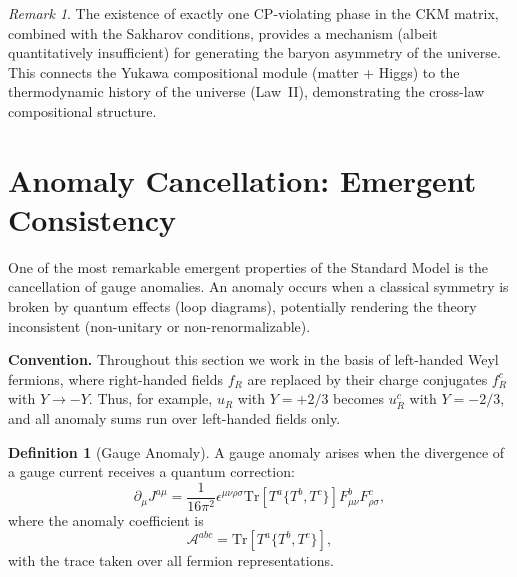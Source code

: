 \documentclass[12pt]{article}
\theoremstyle{definition}
\newtheorem{definition}[theorem]{Definition}
\theoremstyle{remark}
\newtheorem{remark}[theorem]{Remark}
\newcommand{\tr}{\mathrm{Tr}}
\begin{document}
\begin{remark}
The existence of exactly one CP-violating phase in the CKM matrix, combined with the Sakharov conditions, provides a mechanism (albeit quantitatively insufficient) for generating the baryon asymmetry of the universe. This connects the Yukawa compositional module (matter + Higgs) to the thermodynamic history of the universe (Law~II), demonstrating the cross-law compositional structure.
\end{remark}


\section{Anomaly Cancellation: Emergent Consistency}
\label{sec:anomalies}

One of the most remarkable emergent properties of the Standard Model is the cancellation of gauge anomalies. An anomaly occurs when a classical symmetry is broken by quantum effects (loop diagrams), potentially rendering the theory inconsistent (non-unitary or non-renormalizable).

\textbf{Convention.} Throughout this section we work in the basis of left-handed Weyl fermions, where right-handed fields $f_R$ are replaced by their charge conjugates $f_R^c$ with $Y \to -Y$. Thus, for example, $u_R$ with $Y = +2/3$ becomes $u_R^c$ with $Y = -2/3$, and all anomaly sums run over left-handed fields only.

\begin{definition}[Gauge Anomaly]
\label{def:anomaly}
A gauge anomaly arises when the divergence of a gauge current receives a quantum correction:
\begin{equation}
\partial_\mu J^{a\mu} = \frac{1}{16\pi^2} \epsilon^{\mu\nu\rho\sigma} \tr\left[ T^a \{T^b, T^c\} \right] F^b_{\mu\nu} F^c_{\rho\sigma},
\end{equation}
where the anomaly coefficient is
\begin{equation}
\label{eq:anomaly-coefficient}
\mathcal{A}^{abc} = \tr\left[ T^a \{T^b, T^c\} \right],
\end{equation}
with the trace taken over all fermion representations.
\end{definition}
\end{document}
